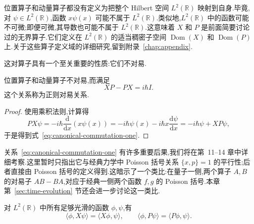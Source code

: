 位置算子和动量算子都没有定义为把整个 Hilbert 空间 \(L^{2}(\mathbb{R})\) 映射到自身.毕竟,对 \(\psi\in L^{2}(\mathbb{R})\),函数 \(x\psi(x)\) 可能不属于 \(L^{2}(\mathbb{R})\).类似地,\(L^{2}(\mathbb{R})\) 中的函数可能不可微;即便可微,其导数也可能不属于 \(L^{2}(\mathbb{R})\).这意味着 \(X\) 和 \(P\) 是前面简要讨论过的无界算子.它们定义在 \(L^{2}(\mathbb{R})\) 的适当稠密子空间 \(\operatorname{Dom}(X)\) 和 \(\operatorname{Dom}(P)\) 上.关于这些算子定义域的详细研究,留到附录~\ref{chap:appendix}.

这对算子具有一个至关重要的性质:它们不对易.

\begin{proposition}[正则对易关系]\label{prop:canonical-commutation-one}
位置算子和动量算子不对易,而满足
\begin{equation}
XP-PX=i\hbar I.
\label{eq:canonical-commutation-one}
\end{equation}
这个关系称为正则对易关系.
\end{proposition}

\begin{proof}
使用乘积法则,计算得
\[
PX\psi=-i\hbar\frac{\mathrm{d}}{\mathrm{d}x}(x\psi(x))
=-i\hbar\psi(x)-i\hbar x\frac{\mathrm{d}\psi}{\mathrm{d}x}
=-i\hbar\psi+XP\psi,
\]
于是得到式~\eqref{eq:canonical-commutation-one}.
\end{proof}

关系~\eqref{eq:canonical-commutation-one} 有许多重要后果,我们将在第~11--14 章中详细考察.这里暂时只指出它与经典力学中 Poisson 括号关系 \(\{x,p\}=1\) 的平行性;后者直接由 Poisson 括号的定义得到.这暗示了一个类比:在量子一侧,两个算子 \(A,B\) 的对易子 \(AB-BA\),对应于经典一侧两个函数 \(f,g\) 的 Poisson 括号.本章第~\ref{sec:time-evolution} 节还会进一步讨论这一类比.

\begin{proposition}[位置与动量算子的对称性]\label{prop:position-momentum-symmetric}
对 \(L^{2}(\mathbb{R})\) 中所有足够光滑的函数 \(\phi,\psi\),有
\[
\langle\phi,X\psi\rangle=\langle X\phi,\psi\rangle,
\qquad
\langle\phi,P\psi\rangle=\langle P\phi,\psi\rangle.
\]
\end{proposition}

